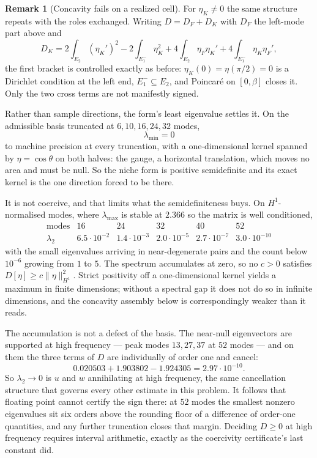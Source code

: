 \documentclass[11pt]{article}
\theoremstyle{definition}
\newtheorem{remark}[theorem]{Remark}
\begin{document}
\begin{remark}[Concavity fails on a realized cell]
For $\eta_K\ne0$ the same structure repeats with the roles exchanged. Writing
$D=D_F+D_K$ with $D_F$ the left-mode part above and
\[
  D_K=2\!\int_{E_2}\!(\eta_K')^2-2\!\int_{E_1^-}\!\eta_K^2
   +4\!\int_{E_2}\!\eta_F\eta_K'+4\!\int_{E_1^-}\!\eta_K\eta_F' ,
\]
the first bracket is controlled exactly as before: $\eta_K(0)=\eta(\pi/2)=0$ is a Dirichlet
condition at the left end, $E_1^-\subseteq E_2$, and Poincar\'e on $[0,\beta]$ closes it.
Only the two cross terms are not manifestly signed.

Rather than sample directions, the form's least eigenvalue settles it. On the admissible
basis truncated at $6,10,16,24,32$ modes,
\[
  \lambda_{\min}=0
\]
to machine precision at every truncation, with a one-dimensional kernel spanned by
$\eta=\cos\theta$ on both halves: the gauge, a horizontal translation, which moves no area
and must be null. So the niche form is positive semidefinite and its exact kernel is the one
direction forced to be there.

It is not coercive, and that limits what the semidefiniteness buys. On $H^1$-normalised
modes, where $\lambda_{\max}$ is stable at $2.366$ so the matrix is well conditioned,
\[
  \begin{array}{r|cccccc}
    \text{modes} & 16 & 24 & 32 & 40 & 52\\\hline
    \lambda_2 & 6.5\cdot10^{-2} & 1.4\cdot10^{-3} & 2.0\cdot10^{-5} & 2.7\cdot10^{-7}
      & 3.0\cdot10^{-10}
  \end{array}
\]
with the small eigenvalues arriving in near-degenerate pairs and the count below $10^{-6}$
growing from $1$ to $5$. The spectrum accumulates at zero, so no $c>0$ satisfies
$D[\eta]\ge c\|\eta\|^2_{H^1}$. Strict positivity off a one-dimensional kernel yields a
maximum in finite dimensions; without a spectral gap it does not do so in infinite
dimensions, and the concavity assembly below is correspondingly weaker than it reads.

The accumulation is not a defect of the basis. The near-null eigenvectors are supported at
high frequency --- peak modes $13,27,37$ at $52$ modes --- and on them the three terms of
$D$ are individually of order one and cancel:
\[
  0.020503+1.903802-1.924305=2.97\cdot10^{-10} .
\]
So $\lambda_2\to0$ is $u$ and $w$ annihilating at high frequency, the same cancellation
structure that governs every other estimate in this problem. It follows that floating point
cannot certify the sign there: at $52$ modes the smallest nonzero eigenvalues sit six orders
above the rounding floor of a difference of order-one quantities, and any further truncation
closes that margin. Deciding $D\ge0$ at high frequency requires interval arithmetic, exactly
as the coercivity certificate's last constant did.


\end{remark}
\end{document}
